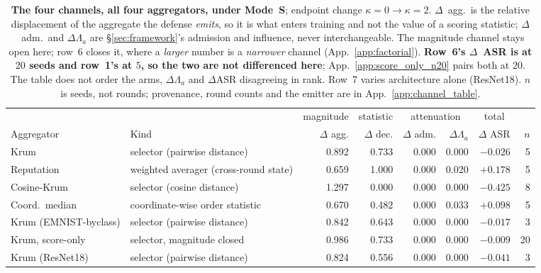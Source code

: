 \documentclass{article}
\begin{document}
\begin{table}[t]
\centering\small\setlength{\tabcolsep}{2.5pt}
\caption{\textbf{The four channels, all four aggregators, under Mode~S}; endpoint change $\kappa{=}0 \to \kappa{=}2$. $\Delta$~agg.\ is the relative displacement of the aggregate the defense \emph{emits}, so it is what enters training and not the value of a scoring statistic; $\Delta$~adm.\ and $\Delta\Lambda_a$ are §\ref{sec:framework}'s admission and influence, never interchangeable. The magnitude channel stays open here; row~6 closes it, where a \emph{larger} number is a \emph{narrower} channel (App.~\ref{app:factorial}). \textbf{Row~6's $\Delta$~ASR is at $20$ seeds and row~1's at $5$, so the two are not differenced here}; App.~\ref{app:score_only_n20} pairs both at $20$. The table does not order the arms, $\Delta\Lambda_a$ and $\Delta$ASR disagreeing in rank. Row~7 varies architecture alone (ResNet18). $n$ is seeds, not rounds; provenance, round counts and the emitter are in App.~\ref{app:channel_table}.}
\label{tab:channels}
\begin{tabular}{@{}llrrrrrr@{}}
\toprule
& & \multicolumn{1}{c}{\scriptsize magnitude} & \multicolumn{1}{c}{\scriptsize statistic} & \multicolumn{2}{c}{\scriptsize attenuation} & \multicolumn{1}{c}{\scriptsize total} & \\
Aggregator & Kind & $\Delta$ agg. & $\Delta$ dec. & $\Delta$ adm. & $\Delta \Lambda_a$ & $\Delta$ ASR & $n$ \\
\midrule
Krum & selector (pairwise distance) & 0.892 & 0.733 & 0.000 & 0.000 & $-0.026$ & 5 \\
Reputation & weighted averager (cross-round state) & 0.659 & 1.000 & 0.000 & 0.020 & $+0.178$ & 5 \\
Cosine-Krum & selector (cosine distance) & 1.297 & 0.000 & 0.000 & 0.000 & $-0.425$ & 8 \\
Coord.\ median & coordinate-wise order statistic & 0.670 & 0.482 & 0.000 & 0.033 & $+0.098$ & 5 \\
Krum (EMNIST-byclass) & selector (pairwise distance) & 0.842 & 0.643 & 0.000 & 0.000 & $-0.017$ & 3 \\
Krum, score-only & selector, magnitude closed & 0.986 & 0.733 & 0.000 & 0.000 & $-0.009$ & 20 \\
Krum (ResNet18) & selector (pairwise distance) & 0.824 & 0.556 & 0.000 & 0.000 & $-0.041$ & 3 \\
\bottomrule
\end{tabular}
\end{table}
\end{document}
